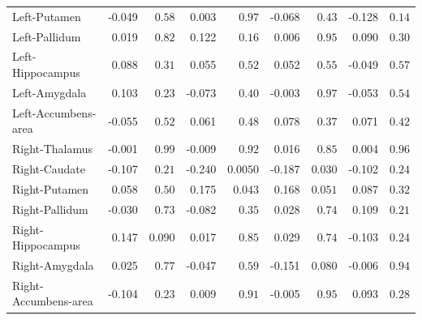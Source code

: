 \begin{tabular}{lrrrrrrrr}
Left-Putamen & -0.049 & $0.58$ & 0.003 & $0.97$ & -0.068 & $0.43$ & -0.128 & $0.14$ \\
Left-Pallidum & 0.019 & $0.82$ & 0.122 & $0.16$ & 0.006 & $0.95$ & 0.090 & $0.30$ \\
Left-Hippocampus & 0.088 & $0.31$ & 0.055 & $0.52$ & 0.052 & $0.55$ & -0.049 & $0.57$ \\
Left-Amygdala & 0.103 & $0.23$ & -0.073 & $0.40$ & -0.003 & $0.97$ & -0.053 & $0.54$ \\
Left-Accumbens-area & -0.055 & $0.52$ & 0.061 & $0.48$ & 0.078 & $0.37$ & 0.071 & $0.42$ \\
Right-Thalamus & -0.001 & $0.99$ & -0.009 & $0.92$ & 0.016 & $0.85$ & 0.004 & $0.96$ \\
Right-Caudate & -0.107 & $0.21$ & -0.240 & $0.0050$ & -0.187 & $0.030$ & -0.102 & $0.24$ \\
Right-Putamen & 0.058 & $0.50$ & 0.175 & $0.043$ & 0.168 & $0.051$ & 0.087 & $0.32$ \\
Right-Pallidum & -0.030 & $0.73$ & -0.082 & $0.35$ & 0.028 & $0.74$ & 0.109 & $0.21$ \\
Right-Hippocampus & 0.147 & $0.090$ & 0.017 & $0.85$ & 0.029 & $0.74$ & -0.103 & $0.24$ \\
Right-Amygdala & 0.025 & $0.77$ & -0.047 & $0.59$ & -0.151 & $0.080$ & -0.006 & $0.94$ \\
Right-Accumbens-area & -0.104 & $0.23$ & 0.009 & $0.91$ & -0.005 & $0.95$ & 0.093 & $0.28$ \\
\bottomrule
\end{tabular}

